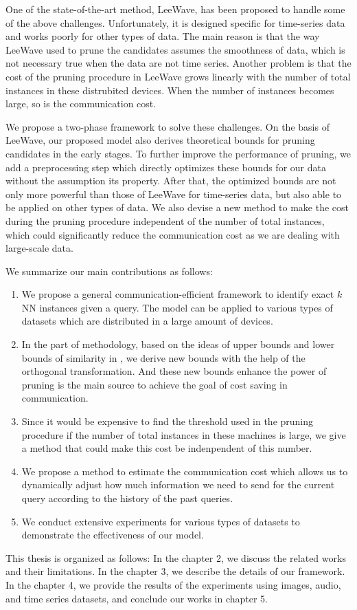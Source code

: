 One of the state-of-the-art method, LeeWave,\cite{LeeWave} has been proposed to handle some of the above challenges.  Unfortunately, it is designed specific for time-series data and works poorly for other types of data.  The main reason is that the way LeeWave used to prune the candidates assumes the smoothness of data, which is not necessary true when the data are not time series.  Another problem is that the cost of the pruning procedure in LeeWave grows linearly with the number of total instances in these distrubited devices.  When the number of instances becomes large, so is the communication cost.


We propose a two-phase framework to solve these challenges.  On the basis of LeeWave, our proposed model also derives theoretical bounds for pruning candidates in the early stages.  To further improve the performance of pruning, we add a preprocessing step which directly optimizes these bounds for our data without the assumption its property.  After that, the optimized bounds are not only more powerful than those of LeeWave for time-series data, but also able to be applied on other types of data.  We also devise a new method to make the cost during the pruning procedure independent of the number of total instances, which could significantly reduce the communication cost as we are dealing with large-scale data.


We summarize our main contributions as follows:
\begin{enumerate}
	\item We propose a general communication-efficient framework to identify exact $k$NN instances given a query. The model can be applied to various types of datasets which are distributed in a large amount of devices.
	\item In the part of methodology, based on the ideas of upper bounds and lower bounds of similarity in \cite{LeeWave}, we derive new bounds with the help of the orthogonal transformation.  And these new bounds enhance the power of pruning is the main source to achieve the goal of cost saving in communication. 
	\item Since it would be expensive to find the threshold used in the pruning procedure if the number of total instances in these machines is large, we give a method that could make this cost be indenpendent of this number.
	\item We propose a method to estimate the communication cost which allows us to dynamically adjust how much information we need to send for the current query according to the history of the past queries.
	\item We conduct extensive experiments for various types of datasets to demonstrate the effectiveness of our model.
\end{enumerate}

This thesis is organized as follows: In the chapter 2, we discuss the related works and their limitations.  In the chapter 3, we describe the details of our framework. In the chapter 4, we provide the results of the experiments using images, audio, and time series datasets, and conclude our works in chapter 5.

%
%